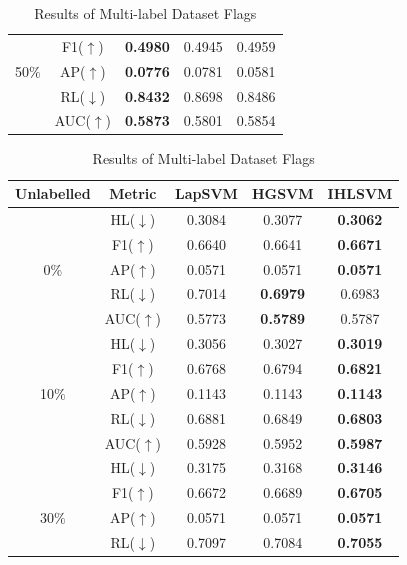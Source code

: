 \documentclass[12pt,a4paper,oneside,english]{report}
\begin{document}
\begin{table}[htbp]
\begin{minipage}[t]{0.48\textwidth}
\begin{tabular}{|c|c|c|c|c|}
            & F1(\(\uparrow\))     & \textbf{0.4980} & 0.4945 & 0.4959 \\
            50\(\%\) & AP(\(\uparrow\))   & \textbf{0.0776} & 0.0781 & 0.0581 \\
            & RL(\(\downarrow \))  & \textbf{0.8432} & 0.8698 & 0.8486 \\
            & AUC(\(\uparrow \))   & \textbf{0.5873} & 0.5801 & 0.5854 \\
            \hline
        \end{tabular}
    \end{minipage}%
    \hfill
    \begin{minipage}[t]{0.48\textwidth}
        \centering
        \caption*{Results of Multi-label Dataset Flags}
        \begin{tabular}{|c|c|c|c|c|}
            \hline
            \textbf{Unlabelled} & \textbf{Metric} & \textbf{LapSVM} & \textbf{HGSVM} & \textbf{IHLSVM} \\
            \hline
            & HL(\(\downarrow \)) & 0.3084 & 0.3077 & \textbf{0.3062} \\
            & F1(\(\uparrow\))    & 0.6640 & 0.6641 & \textbf{0.6671} \\
            0\(\%\) & AP(\(\uparrow\))   & 0.0571 & 0.0571 & \textbf{0.0571} \\
            & RL(\(\downarrow \)) & 0.7014 & \textbf{0.6979} & 0.6983 \\
            & AUC(\(\uparrow \))  & 0.5773 & \textbf{0.5789} & 0.5787 \\
            \hline
            & HL(\(\downarrow \))  & 0.3056 & 0.3027 & \textbf{0.3019} \\
            & F1(\(\uparrow\))     & 0.6768 & 0.6794 & \textbf{0.6821} \\
            10\(\%\) & AP(\(\uparrow\))   & 0.1143 & 0.1143 & \textbf{0.1143} \\
            & RL(\(\downarrow \))  & 0.6881 & 0.6849 & \textbf{0.6803} \\
            & AUC(\(\uparrow \))   & 0.5928 & 0.5952 & \textbf{0.5987} \\
            \hline
            & HL(\(\downarrow \))  & 0.3175 & 0.3168 & \textbf{0.3146} \\
            & F1(\(\uparrow\))     & 0.6672 & 0.6689 & \textbf{0.6705} \\
            30\(\%\) & AP(\(\uparrow\))   & 0.0571 & 0.0571 & \textbf{0.0571} \\
            & RL(\(\downarrow \))  & 0.7097 & 0.7084 & \textbf{0.7055} \\

\end{tabular}
\end{minipage}
\end{table}
\end{document}
